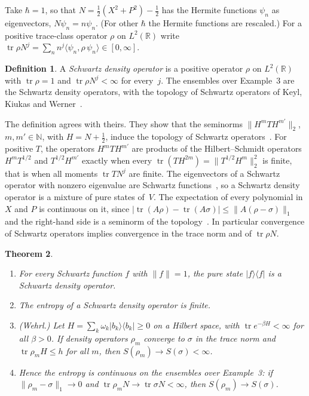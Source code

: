 \documentclass[11pt]{article}
\newtheorem{theorem}{Theorem}[section]
\theoremstyle{definition}
\newtheorem{definition}[theorem]{Definition}
\begin{document}
Take $\hbar = 1$, so that $N = \frac12(X^2 + P^2) - \frac12$ has the Hermite functions $\psi_n$
as eigenvectors, $N\psi_n = n\psi_n$. (For other $\hbar$ the Hermite functions are rescaled.) For a
positive trace-class operator $\rho$ on $L^2(\mathbb R)$ write
$\operatorname{tr}\rho N^j = \sum_n n^j\langle\psi_n, \rho\,\psi_n\rangle \in [0, \infty]$.

\begin{definition}\label{def:ensembles}
  A \emph{Schwartz density operator} is a positive operator $\rho$ on $L^2(\mathbb R)$ with
  $\operatorname{tr}\rho = 1$ and $\operatorname{tr}\rho N^j < \infty$ for every~$j$. The
  ensembles over Example~3 are the Schwartz density operators, with the topology of Schwartz
  operators of Keyl, Kiukas and Werner~\cite{kkw}.
\end{definition}

The definition agrees with theirs. They show that the seminorms
$\|H^m T H^{m'}\|_2$, $m, m' \in \mathbb N$, with $H = N + \frac12$, induce the topology of
Schwartz operators~\cite[Sec.~3.3]{kkw}. For positive $T$, the operators $H^m T H^{m'}$ are
products of the Hilbert--Schmidt operators $H^m T^{1/2}$ and $T^{1/2} H^{m'}$ exactly when every
$\operatorname{tr}(T H^{2m}) = \|T^{1/2}H^m\|_2^2$ is finite, that is when all moments
$\operatorname{tr}TN^j$ are finite. The eigenvectors of a Schwartz operator with nonzero eigenvalue are Schwartz
functions~\cite[Lemma~3.5(c)]{kkw}, so a Schwartz density operator is a mixture of pure states
of~$V$. The expectation of every polynomial in $X$ and $P$ is continuous on it, since
$|\operatorname{tr}(A\rho) - \operatorname{tr}(A\sigma)| \le \|A(\rho - \sigma)\|_1$ and the
right-hand side is a seminorm of the topology~\cite[eq.~(20)]{kkw}. In particular convergence
of Schwartz operators implies convergence in the trace norm and of $\operatorname{tr}\rho N$.

\begin{theorem}\label{thm:ensembles}
  \begin{enumerate}
    \item For every Schwartz function $f$ with $\|f\| = 1$, the pure state $|f\rangle\langle f|$
      is a Schwartz density operator.
    \item The entropy of a Schwartz density operator is finite.
    \item \emph{(Wehrl.)} Let $H = \sum_k \omega_k |b_k\rangle\langle b_k| \ge 0$ on a Hilbert
      space, with $\operatorname{tr}e^{-\beta H} < \infty$ for all $\beta > 0$. If density
      operators $\rho_m$ converge to $\sigma$ in the trace norm and
      $\operatorname{tr}\rho_m H \le h$ for all $m$, then $S(\rho_m) \to S(\sigma) < \infty$.
    \item Hence the entropy is continuous on the ensembles over Example~3: if
      $\|\rho_m - \sigma\|_1 \to 0$ and $\operatorname{tr}\rho_m N \to \operatorname{tr}\sigma N
      < \infty$, then $S(\rho_m) \to S(\sigma)$.
  \end{enumerate}
\end{theorem}
\end{document}

